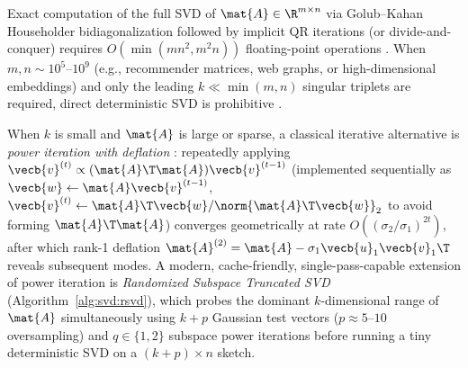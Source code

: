 \documentclass[../../../../master.tex]{subfiles}
\begin{document}
Exact computation of the full SVD of $\mat{A} \in \R^{m \times n}$ via Golub--Kahan Householder bidiagonalization followed by implicit QR iterations (or divide-and-conquer) requires $O(\min(mn^2, m^2n))$ floating-point operations  . When $m, n \sim 10^5$--$10^9$ (e.g., recommender matrices, web graphs, or high-dimensional embeddings) and only the leading $k \ll \min(m,n)$ singular triplets are required, direct deterministic SVD is prohibitive .

When $k$ is small and $\mat{A}$ is large or sparse, a classical iterative alternative is \emph{power iteration with deflation} : repeatedly applying $\vecb{v}^{(t)} \propto (\mat{A}\T\mat{A})\vecb{v}^{(t-1)}$ (implemented sequentially as $\vecb{w} \leftarrow \mat{A}\vecb{v}^{(t-1)}$, $\vecb{v}^{(t)} \leftarrow \mat{A}\T\vecb{w}/\norm{\mat{A}\T\vecb{w}}_2$ to avoid forming $\mat{A}\T\mat{A}$) converges geometrically at rate $O((\sigma_2/\sigma_1)^{2t})$, after which rank-1 deflation $\mat{A}^{(2)} = \mat{A} - \sigma_1\vecb{u}_1\vecb{v}_1\T$ reveals subsequent modes. A modern, cache-friendly, single-pass-capable extension of power iteration is \emph{Randomized Subspace Truncated SVD} (Algorithm~\ref{alg:svd:rsvd}), which probes the dominant $k$-dimensional range of $\mat{A}$ simultaneously using $k + p$ Gaussian test vectors ($p \approx 5$--$10$ oversampling) and $q \in \{1,2\}$ subspace power iterations before running a tiny deterministic SVD on a $(k+p) \times n$ sketch.
\end{document}
